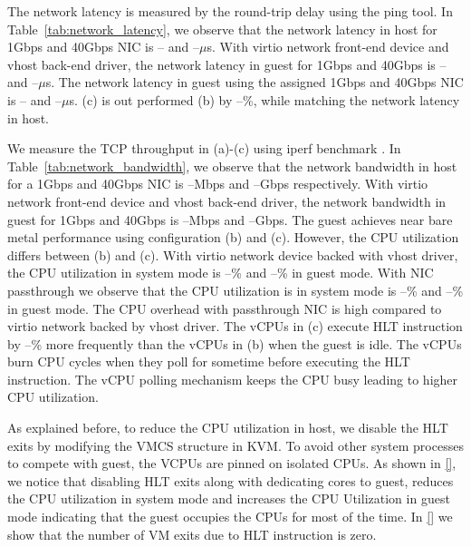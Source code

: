 The network latency is measured by the round-trip delay using
the ping tool. In Table~\ref{tab:network_latency}, we observe
that the network latency in host for 1Gbps and 40Gbps NIC is
-- and --$\mu$s. With virtio network front-end device and
vhost back-end driver, the network latency in guest for 1Gbps
and 40Gbps is -- and --$\mu$s. The network latency in guest
using the assigned 1Gbps and 40Gbps NIC is -- and --$\mu$s.
(c) is out performed (b) by --\%, while matching the network
latency in host.

We measure the TCP throughput in (a)-(c) using iperf benchmark
\cite{iperf}. In Table~\ref{tab:network_bandwidth}, we observe that
the network bandwidth in host for a 1Gbps and 40Gbps NIC is
--Mbps and --Gbps respectively. With virtio network front-end
device and vhost back-end driver, the network bandwidth in
guest for 1Gbps and 40Gbps is --Mbps and --Gbps. The guest
achieves near bare metal performance using configuration (b)
and (c).  However, the CPU utilization differs between (b) and
(c). With virtio network device backed with vhost driver, the
CPU utilization in system mode is --\% and --\% in guest mode.
With NIC passthrough we observe that the CPU utilization is in
system mode is --\% and --\% in guest mode. The CPU overhead
with passthrough NIC is high compared to virtio network backed
by vhost driver. The vCPUs in (c) execute HLT instruction by
--\% more frequently than the vCPUs in (b) when the guest is
idle. The vCPUs burn CPU cycles when they poll for sometime
before executing the HLT instruction. The vCPU polling
mechanism keeps the CPU busy leading to higher CPU
utilization.

As explained before, to reduce the CPU utilization in host, we
disable the HLT exits by modifying the VMCS structure in KVM.
To avoid other system processes to compete with guest, the
VCPUs are pinned on isolated CPUs. As shown in \ref{}, we
notice that disabling HLT exits along with dedicating cores to
guest, reduces the CPU utilization in system mode and
increases the CPU Utilization in guest mode indicating that
the guest occupies the CPUs for most of the time. In \ref{} we
show that the number of VM exits due to HLT instruction is
zero.
